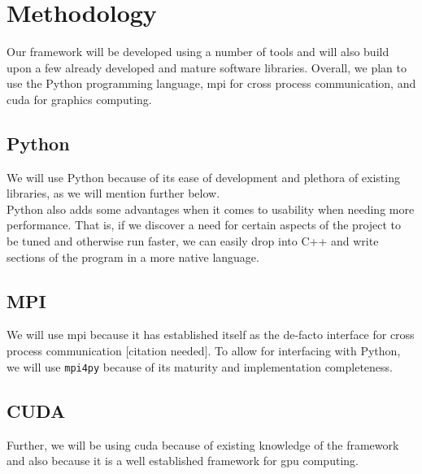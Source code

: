 \section{Methodology}

Our framework will be developed using a number of tools and will also build
upon a few already developed and mature software libraries. Overall, we plan to
use the Python programming language, \gls{mpi} for cross process communication,
and \gls{cuda} for graphics computing.

\subsection{Python}

We will use Python because of its ease of development and plethora of existing
libraries, as we will mention further below.\\

Python also adds some advantages when it comes to usability when needing more
performance. That is, if we discover a need for certain aspects of the project
to be tuned and otherwise run faster, we can easily drop into C++ and write
sections of the program in a more native language.

\subsection{MPI}

We will use \gls{mpi} because it has established itself as the de-facto
interface for cross process communication [citation needed]. To allow for
interfacing with Python, we will use \texttt{mpi4py} because of its maturity
and implementation completeness.

\subsection{CUDA}

Further, we will be using \Gls{cuda} because of existing knowledge of the
framework and also because it is a well established framework for \gls{gpu}
computing.
